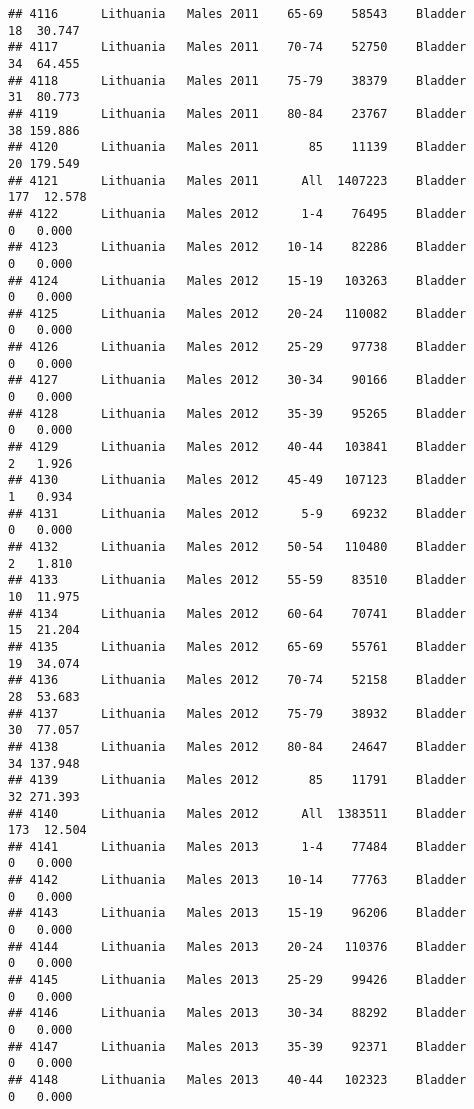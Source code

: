 \documentclass[
]{article}
\begin{document}
\begin{verbatim}
## 4116      Lithuania   Males 2011    65-69    58543    Bladder     18  30.747
## 4117      Lithuania   Males 2011    70-74    52750    Bladder     34  64.455
## 4118      Lithuania   Males 2011    75-79    38379    Bladder     31  80.773
## 4119      Lithuania   Males 2011    80-84    23767    Bladder     38 159.886
## 4120      Lithuania   Males 2011       85    11139    Bladder     20 179.549
## 4121      Lithuania   Males 2011      All  1407223    Bladder    177  12.578
## 4122      Lithuania   Males 2012      1-4    76495    Bladder      0   0.000
## 4123      Lithuania   Males 2012    10-14    82286    Bladder      0   0.000
## 4124      Lithuania   Males 2012    15-19   103263    Bladder      0   0.000
## 4125      Lithuania   Males 2012    20-24   110082    Bladder      0   0.000
## 4126      Lithuania   Males 2012    25-29    97738    Bladder      0   0.000
## 4127      Lithuania   Males 2012    30-34    90166    Bladder      0   0.000
## 4128      Lithuania   Males 2012    35-39    95265    Bladder      0   0.000
## 4129      Lithuania   Males 2012    40-44   103841    Bladder      2   1.926
## 4130      Lithuania   Males 2012    45-49   107123    Bladder      1   0.934
## 4131      Lithuania   Males 2012      5-9    69232    Bladder      0   0.000
## 4132      Lithuania   Males 2012    50-54   110480    Bladder      2   1.810
## 4133      Lithuania   Males 2012    55-59    83510    Bladder     10  11.975
## 4134      Lithuania   Males 2012    60-64    70741    Bladder     15  21.204
## 4135      Lithuania   Males 2012    65-69    55761    Bladder     19  34.074
## 4136      Lithuania   Males 2012    70-74    52158    Bladder     28  53.683
## 4137      Lithuania   Males 2012    75-79    38932    Bladder     30  77.057
## 4138      Lithuania   Males 2012    80-84    24647    Bladder     34 137.948
## 4139      Lithuania   Males 2012       85    11791    Bladder     32 271.393
## 4140      Lithuania   Males 2012      All  1383511    Bladder    173  12.504
## 4141      Lithuania   Males 2013      1-4    77484    Bladder      0   0.000
## 4142      Lithuania   Males 2013    10-14    77763    Bladder      0   0.000
## 4143      Lithuania   Males 2013    15-19    96206    Bladder      0   0.000
## 4144      Lithuania   Males 2013    20-24   110376    Bladder      0   0.000
## 4145      Lithuania   Males 2013    25-29    99426    Bladder      0   0.000
## 4146      Lithuania   Males 2013    30-34    88292    Bladder      0   0.000
## 4147      Lithuania   Males 2013    35-39    92371    Bladder      0   0.000
## 4148      Lithuania   Males 2013    40-44   102323    Bladder      0   0.000

\end{verbatim}
\end{document}
